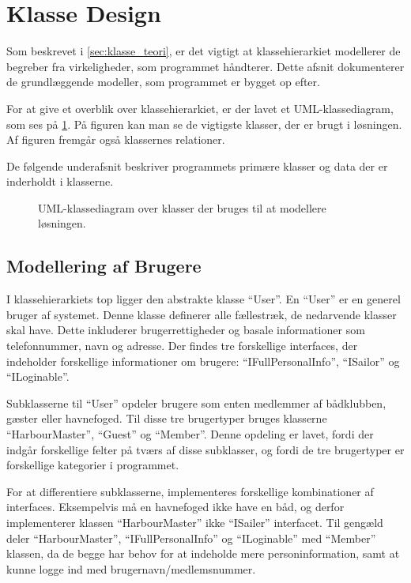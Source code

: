\section{Klasse Design}
\label{sec:klasse_design}

Som beskrevet i \cref{sec:klasse_teori}, er det vigtigt at klassehierarkiet modellerer de begreber fra virkeligheder, som programmet håndterer. Dette afsnit dokumenterer de grundlæggende modeller, som programmet er bygget op efter. 

For at give et overblik over klassehierarkiet, er der lavet et UML-klassediagram, som ses på \cref{fig:UML}. På figuren kan man se de vigtigste klasser, der er brugt i løsningen. Af figuren fremgår også klassernes relationer.

De følgende underafsnit beskriver programmets primære klasser og data der er inderholdt i klasserne.

\begin{figure}
  \centering
  \vspace*{-4.5cm}
 	\caption{UML-klassediagram over klasser der bruges til at modellere løsningen.} \label{fig:UML}  
 \end{figure}

\subsection{Modellering af Brugere}
\label{sub:brugere_af_programmet}

I klassehierarkiets top ligger den abstrakte klasse \enquote{User}. En \enquote{User} er en generel bruger af systemet. Denne klasse definerer alle fællestræk, de nedarvende klasser skal have. Dette inkluderer brugerrettigheder og basale informationer som telefonnummer, navn og adresse. Der findes tre forskellige interfaces, der indeholder forskellige informationer om brugere: \enquote{IFullPersonalInfo}, \enquote{ISailor} og \enquote{ILoginable}.

Subklasserne til \enquote{User} opdeler brugere som enten medlemmer af bådklubben, gæster eller havnefoged. Til disse tre brugertyper bruges klasserne \enquote{HarbourMaster}, \enquote{Guest} og \enquote{Member}. Denne opdeling er lavet, fordi der indgår forskellige felter på tværs af disse subklasser, og fordi de tre brugertyper er forskellige kategorier i programmet. 

For at differentiere subklasserne, implementeres forskellige kombinationer af interfaces. Eksempelvis må en havnefoged ikke have en båd, og derfor implementerer klassen \enquote{HarbourMaster} ikke \enquote{ISailer} interfacet. Til gengæld deler \enquote{HarbourMaster}, \enquote{IFullPersonalInfo} og \enquote{ILoginable} med \enquote{Member} klassen, da de begge har behov for at indeholde mere personinformation, samt at kunne logge ind med brugernavn/medlemsnummer.

